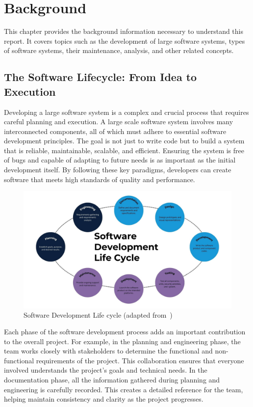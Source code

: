\chapter{Background}

This chapter provides the background information necessary to understand this report. It covers topics such as the development of large software systems, types of software systems, their maintenance, analysis, and other related concepts.

\section{The Software Lifecycle: From Idea to Execution}

Developing a large software system is a complex and crucial process that requires careful planning and execution. A large scale software system involves many interconnected components, all of which must adhere to essential software development principles. The goal is not just to write code but to build a system that is reliable, maintainable, scalable, and efficient. Ensuring the system is free of bugs and capable of adapting to future needs is as important as the initial development itself. By following these key paradigms, developers can create software that meets high standards of quality and performance.

\begin{figure}[H]
    \centering
    \includegraphics[width=1\textwidth]{figures/software_development.png}
    \caption{Software Development Life cycle (adapted from~\citep{sire_sdlc_2024})}
	\label{fig_background_sd}
\end{figure}

Each phase of the software development process adds an important contribution to the overall project. For example, in the planning and engineering phase, the team works closely with stakeholders to determine the functional and non-functional requirements of the project. This collaboration ensures that everyone involved understands the project's goals and technical needs. In the documentation phase, all the information gathered during planning and engineering is carefully recorded. This creates a detailed reference for the team, helping maintain consistency and clarity as the project progresses.

